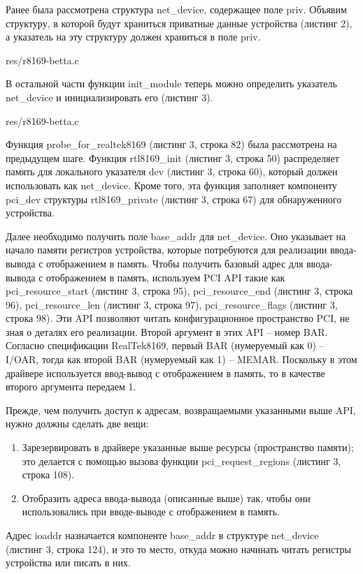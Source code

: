 Ранее была рассмотрена структура net\_device, содержащее поле priv. Объявим структуру, в которой будут храниться приватные данные устройства (листинг 2), а указатель на эту структуру должен храниться в поле priv.


{res/r8169-betta.c}

В остальной части функции init\_module теперь можно определить указатель net\_device и инициализировать его (листинг 3).


{res/r8169-betta.c}

Функция probe\_for\_realtek8169 (листинг 3, строка 82) была рассмотрена на предыдущем шаге. Функция rtl8169\_init (листинг 3, строка 50) распределяет память для локального указателя dev (листинг 3, строка 60), который должен использовать как net\_device. Кроме того, эта функция заполняет компоненту pci\_dev структуры rtl8169\_private (листинг 3, строка 67) для обнаруженного устройства.

Далее необходимо получить поле base\_addr для net\_device. Оно указывает на начало памяти регистров устройства, которые потребуются для реализации ввода-вывода с отображением в память. Чтобы получить базовый адрес для ввода-вывода с отображением в память, используем PCI API такие как pci\_resource\_start (листинг 3, строка 95), pci\_resource\_end (листинг 3, строка 96), pci\_resource\_len (листинг 3, строка 97), pci\_resource\_flags (листинг 3, строка 98). Эти API позволяют читать конфигурационное пространство PCI, не зная о деталях его реализации. Второй аргумент в этих API -- номер BAR. Согласно спецификации RealTek8169, первый BAR (нумеруемый как 0) -- I/OAR, тогда как второй BAR (нумеруемый как 1) -- MEMAR. Поскольку в этом драйвере используется ввод-вывод с отображением в память, то в качестве второго аргумента передаем 1.

Прежде, чем получить доступ к адресам, возвращаемыми указанными выше API, нужно должны сделать две вещи:
\begin{enumerate}
\item Зарезервировать в драйвере указанные выше ресурсы (пространство памяти); это делается с помощью вызова функции pci\_request\_regions (листинг 3, строка 108).
\item Отобразить адреса ввода-вывода (описанные выше) так, чтобы они использовались при вводе-выводе с отображением в память.
\end{enumerate}
Адрес ioaddr назначается компоненте base\_addr в структуре net\_device (листинг 3, строка 124), и это то место, откуда можно начинать читать регистры устройства или писать в них.

